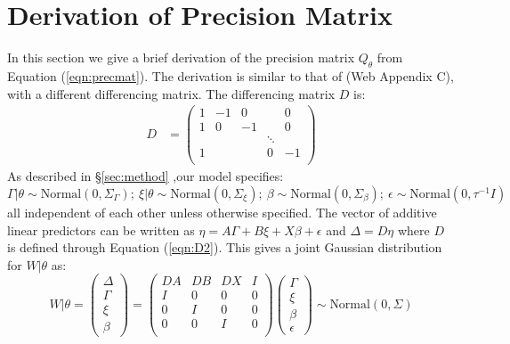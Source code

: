 \documentclass[ba]{imsart}
\begin{document}
\appendix

\section{Derivation of Precision Matrix}

In this section we give a brief derivation of the precision matrix $Q_{\theta}$ from Equation (\ref{eqn:precmat}). The derivation is similar to that of \cite{casecross} (Web Appendix C), with a different differencing matrix. The differencing matrix $D$ is:
\begin{equation}\begin{aligned}\label{eqn:D2}
D &= \begin{pmatrix}
1 & -1 & 0 & & 0 \\
1 & 0 & -1 & & 0 \\
  &    &  & \ddots  &   \\
1 &    &       & 0 & -1 \\
\end{pmatrix}
\end{aligned}\end{equation}
As described in \S\ref{sec:method} ,our model specifies:
\begin{equation*}
\Gamma|\theta \sim \text{Normal}\left( 0,\Sigma_{\Gamma}\right); \ \xi|\theta \sim \text{Normal}\left( 0,\Sigma_{\xi}\right); \ \beta \sim \text{Normal}\left( 0,\Sigma_{\beta}\right); \ \epsilon \sim \text{Normal}\left( 0,\tau^{-1}I\right)
\end{equation*}
all independent of each other unless otherwise specified. The vector of additive linear predictors can be written as $\eta = A\Gamma + B\xi + X\beta + \epsilon$ and $\Delta = D\eta$ where $D$ is defined through Equation (\ref{eqn:D2}). This gives a joint Gaussian distribution for $W|\theta$ as:
\begin{equation*}
W|\theta = \begin{pmatrix} \Delta \\ \Gamma \\ \xi \\\beta \end{pmatrix} = \begin{pmatrix} DA & DB & DX & I \\ I & 0 & 0 & 0 \\ 0 & I & 0 & 0 \\ 0 & 0 & I & 0 \\ \end{pmatrix}\begin{pmatrix}\Gamma\\ \xi \\ \beta \\ \epsilon \end{pmatrix} 
\sim \text{Normal}\left( 0,\Sigma\right)
\end{equation*}
\end{document}
